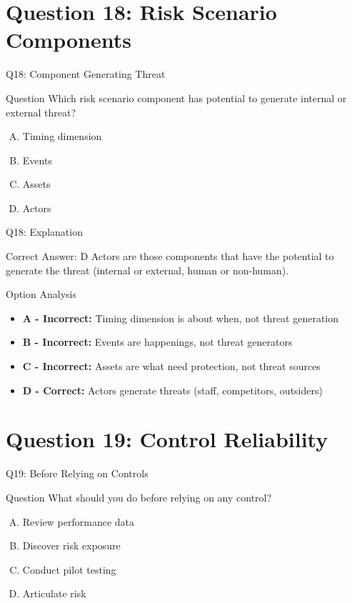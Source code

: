 \documentclass{beamer}
\begin{document}
	\section{Question 18: Risk Scenario Components}
	
	\begin{frame}{Q18: Component Generating Threat}
		\begin{block}{Question}
			Which risk scenario component has potential to generate internal or external threat?
		\end{block}
		\begin{enumerate}[(A)]
			\item Timing dimension
			\item Events
			\item Assets
			\item Actors
		\end{enumerate}
	\end{frame}
	
	\begin{frame}{Q18: Explanation}
		\begin{block}{Correct Answer: D}
			Actors are those components that have the potential to generate the threat (internal or external, human or non-human).
		\end{block}
		\begin{block}{Option Analysis}
			\begin{itemize}
				\item \textbf{A - Incorrect:} Timing dimension is about when, not threat generation
				\item \textbf{B - Incorrect:} Events are happenings, not threat generators
				\item \textbf{C - Incorrect:} Assets are what need protection, not threat sources
				\item \textbf{D - Correct:} Actors generate threats (staff, competitors, outsiders)
			\end{itemize}
		\end{block}
	\end{frame}
	
	\section{Question 19: Control Reliability}
	
	\begin{frame}{Q19: Before Relying on Controls}
		\begin{block}{Question}
			What should you do before relying on any control?
		\end{block}
		\begin{enumerate}[(A)]
			\item Review performance data
			\item Discover risk exposure
			\item Conduct pilot testing
			\item Articulate risk
		\end{enumerate}
	\end{frame}
	
\end{document}
